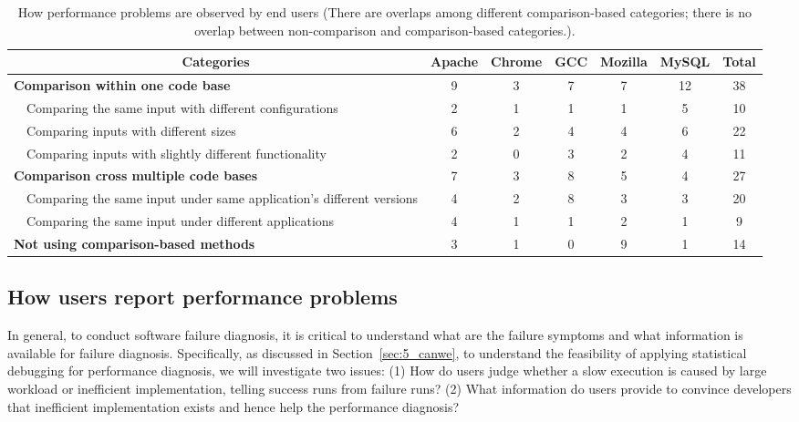 \begin{table*}[tb!]
\begin{adjustwidth}{-1.5in}{-1.5in}
\scriptsize
\centering
{
\begin{tabular}{lcccccc}
\toprule
\multicolumn{1}{c}{Categories} &Apache&Chrome&GCC&Mozilla&MySQL&Total\\
\midrule
\multicolumn{1}{l}{\textbf{Comparison within one code base}}
&9&3&7&7&12&38\\
\ \ Comparing the same input with different configurations &2&1&1&1&5&10\\
\ \ Comparing inputs with different sizes&6&2&4&4&6&22\\
\ \ Comparing inputs with slightly different functionality&2&0&3&2&4&11\\
\midrule
\multicolumn{1}{l}{\textbf{Comparison cross multiple code bases}}
&7&3&8&5&4&27\\
\ \ Comparing the same input under same application's different versions
&4&2&8&3&3&20\\
\ \ Comparing the same input under different applications
&4&1&1&2&1&9\\
\midrule
\multicolumn{1}{l}{\textbf{Not using comparison-based methods}}
&3&1&0&9&1&14\\
\bottomrule
\end{tabular}
}
\end{adjustwidth}
\caption{How performance problems are observed by end users (There are overlaps among
    different comparison-based categories; there is no overlap between non-comparison
    and comparison-based categories.).}
\label{tab:5_cmp}
\end{table*}







\subsection{How users report performance problems}
In general, to conduct software failure diagnosis, it is critical to understand 
what are the failure symptoms and what information is available for failure
diagnosis. 
Specifically, as discussed in Section~\ref{sec:5_canwe}, to understand the
feasibility of applying statistical debugging for performance diagnosis, we
will investigate two issues: (1)
How do users judge whether a slow execution is caused by large workload or
inefficient implementation, telling success runs from failure
runs?
(2)
What information do users provide to convince developers that inefficient
implementation exists and hence help the performance diagnosis?


